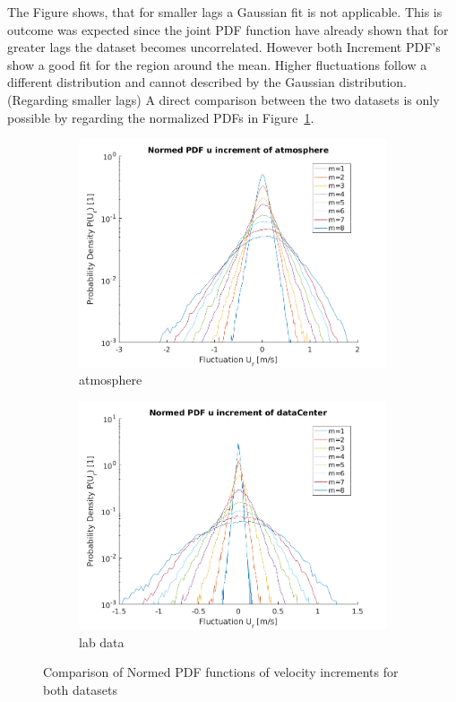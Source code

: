 \documentclass[12pt]{article}
\begin{document}
The Figure shows, that for smaller lags a Gaussian fit is not applicable. This is outcome was expected since the joint PDF function have already shown that for greater lags the dataset becomes uncorrelated. However both Increment PDF's show a good fit for the region around the mean. Higher fluctuations follow a different distribution and cannot described by the Gaussian distribution. (Regarding smaller lags)
A direct comparison between the two datasets is only possible by regarding the normalized PDFs in Figure~\ref{fig:comparison_pdf_incr_normed}.

\begin{figure}[H]
\begin{subfigure}{0.5\textwidth}
  \centering
  \includegraphics[width=1\linewidth]{figures/pdf_increments_atmo_normed.png}
  \caption{atmosphere}
\end{subfigure}
\begin{subfigure}{0.5\textwidth}
  \centering
  \includegraphics[width=1\linewidth]{figures/pdf_increments_center_normed.png}
  \caption{lab data}
\end{subfigure}
\caption{Comparison of Normed PDF functions of velocity increments for both datasets}
\label{fig:comparison_pdf_incr_normed}
\end{figure}
\end{document}
